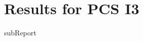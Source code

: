 \renewcommand{\DTRPcs}{I3} %
\renewcommand{\DTRPcsLong}{I3}


    \section{Results for PCS \DTRPcsLong}

    {{subReport}}
    \newpage

